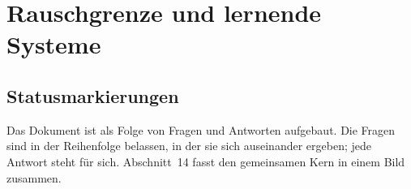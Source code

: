 
\providecommand{\BM}{\textbf{[B]}}
\providecommand{\KM}{\textbf{[K]}}
\providecommand{\SM}{\textbf{[S]}}
\providecommand{\XM}{\textbf{[X]}}
\providecommand{\QM}{\textbf{[Q]}}

\chapter*{Rauschgrenze und lernende Systeme}

\begin{abstract}
Der Korpus kennt eine Rauschgrenze: Ab einer bestimmten Messtoleranz sind harmonische Zusammenhänge
nicht mehr von Zufall zu unterscheiden (Dok.~343, Satz G$'$). Dieses Dokument geht in Frage und
Antwort der Frage nach, ob neuronale Netze und Sprachmodelle an dieselbe Grenze stoßen, warum sie
trotzdem fast immer lesbare Sätze bilden, warum Sprache Fehler verzeiht und Zahlen nicht, und welche
Rolle Wahrscheinlichkeit und die Gewichte eines Netzes dabei spielen. Ein Nulltest mit vollständiger
symbolischer Suche über rund 23 Millionen Ausdrücke zeigt, dass die dimensionslosen Messgrößen der
Grundform allein keine harmonische Struktur über Zufallsniveau tragen, und dass selbst eine echte
Regel wie die Balmer-Serie aus wenigen Beispielen nur mit der passenden, engen Vorgabe sichtbar wird.
Der gemeinsame Kern aller Antworten: Diskrete Struktur ist fehlertolerant, die Rauschgrenze sitzt
am Übergang vom Diskreten zum Kontinuum, und Struktur, die die Daten nicht hergeben, muss vorgegeben
und dann geprüft werden.
\end{abstract}

\section*{Statusmarkierungen}


\noindent Das Dokument ist als Folge von Fragen und Antworten aufgebaut. Die Fragen sind in der
Reihenfolge belassen, in der sie sich auseinander ergeben; jede Antwort steht für sich. Abschnitt~14
fasst den gemeinsamen Kern in einem Bild zusammen.

